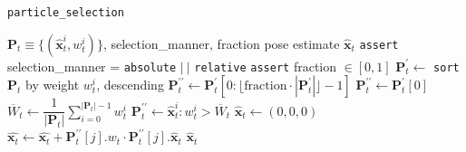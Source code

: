 \begin{algorithm}[h]
  \caption{\texttt{particle\_selection}}
  \label{alg:particle_selection}
  \begin{spacing}{1.2}
  \begin{algorithmic}[1]
    \REQUIRE $\bm{P}_t \equiv \{(\hat{\bm{x}}_t^i, w_t^i)\}$, selection\_manner, fraction
    \ENSURE pose estimate $\hat{\bm{x}}_t$
    \STATE \texttt{assert} selection\_manner = \texttt{absolute} $|\ |$ \texttt{relative}
    \STATE \texttt{assert} fraction $\in [0,1]$
      \STATE $\bm{P}_t^\prime \leftarrow $ \texttt{sort} $\bm{P}_t$ by weight $w_t^i$, descending
        \STATE $\bm{P}_t^{\prime\prime} \leftarrow \bm{P}_t^\prime[0: \lfloor\text{fraction}\cdot|\bm{P}_t^\prime| \rfloor - 1]$
      \ELSE
        \STATE $\bm{P}_t^{\prime\prime} \leftarrow \bm{P}_t^\prime[0]$
      \ENDIF
    \ENDIF
      \STATE $\overline{W}_t \leftarrow \dfrac{1}{|\bm{P}_t|}\sum\limits_{i=0}^{|\bm{P}_t|-1} w_t^i$
      \STATE $\bm{P}_t^{\prime\prime} \leftarrow \hat{\bm{x}}_t^i : w_t^i > \overline{W}_t$
    \ENDIF
    \STATE $\hat{\bm{x}}_t \leftarrow (0,0,0)$
      \STATE $\hat{\bm{x}_t} \leftarrow \hat{\bm{x}_t} + \bm{P}_t^{\prime\prime}[j].w_t \cdot \bm{P}_t^{\prime\prime}[j].\hat{\bm{x}}_t$
    \ENDFOR
    \RETURN $\hat{\bm{x}}_t$
  \end{algorithmic}
  \end{spacing}
\end{algorithm}


